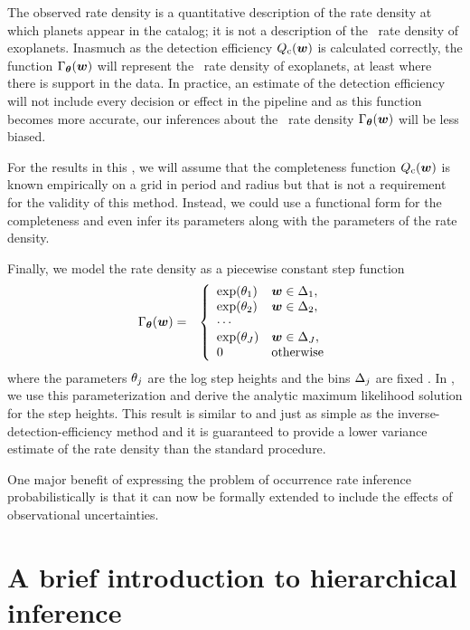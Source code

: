 The observed rate density \obs{\rate} is a quantitative description of the
rate density at which planets appear in the \citet{Petigura:2013} catalog; it is
not a description of the \True\ rate density of exoplanets.
Inasmuch as the detection efficiency ${Q_\mathrm{c}}({\boldsymbol{w}})$ is calculated
correctly, the function $\Gamma_{\boldsymbol{{\theta}}}({\boldsymbol{w}})$ will represent the \True\
rate density of exoplanets, at least where there is support in the data.
In practice, an estimate of the detection efficiency will not include every
decision or effect in the pipeline and as this function becomes more accurate,
our inferences about the \True\ rate density $\Gamma_{\boldsymbol{{\theta}}}({\boldsymbol{w}})$ will be
less biased.

For the results in this \paper, we will assume that the completeness function
${Q_\mathrm{c}}({\boldsymbol{w}})$ is known empirically on a grid in period and radius
but that is not a requirement for the validity of this method.
Instead, we could use a functional form for the completeness and even infer
its parameters along with the parameters of the rate density.

Finally, we model the rate density as a piecewise constant step function
\begin{eqnarray}\eqlabel{rate-model}
\rate_\ratepars (\entry) &=& \left\{\begin{array}{ll}
\exp(\ratepar_1) & \entry \in \binarea_1,\\
\exp(\ratepar_2) & \entry \in \binarea_2,\\
\cdots \\
\exp(\ratepar_J) & \entry \in \binarea_J,\\
0 & \mathrm{otherwise}
\end{array}\right.
\end{eqnarray}
where the parameters ${\theta}_j$ are the log step heights and the bins
${\Delta}_j$ are fixed \foreign{a priori}.
In , we use this parameterization and derive the analytic
maximum likelihood solution for the step heights.
This result is similar to and just as simple as the
inverse-detection-efficiency method and it is guaranteed to provide a lower
variance estimate of the rate density than the standard procedure.

One major benefit of expressing the problem of occurrence rate inference
probabilistically is that it can now be formally extended to include the
effects of observational uncertainties.

\section{A brief introduction to hierarchical inference}

